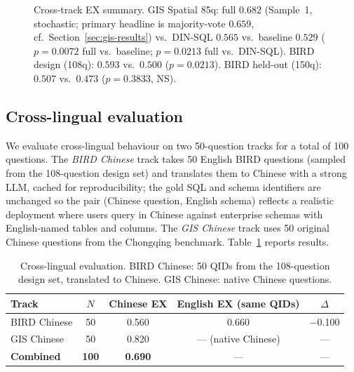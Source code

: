 \documentclass[11pt]{article}
\begin{document}
\begin{figure}[t]
\caption{Cross-track EX summary. GIS Spatial 85q: full $0.682$ (Sample~1, stochastic; primary headline is majority-vote $0.659$, cf.\ Section~\ref{sec:gis-results}) vs.\ DIN-SQL $0.565$ vs.\ baseline $0.529$ ($p=0.0072$ full vs.\ baseline; $p=0.0213$ full vs.\ DIN-SQL). BIRD design (108q): $0.593$ vs.\ $0.500$ ($p=0.0213$). BIRD held-out (150q): $0.507$ vs.\ $0.473$ ($p=0.3833$, NS).}
\label{fig:cross}
\end{figure}

\subsection{Cross-lingual evaluation}
\label{sec:cross-lingual}

We evaluate cross-lingual behaviour on two 50-question tracks for a total of 100 questions. The \emph{BIRD Chinese} track takes 50 English BIRD questions (sampled from the 108-question design set) and translates them to Chinese with a strong LLM, cached for reproducibility; the gold SQL and schema identifiers are unchanged so the pair (Chinese question, English schema) reflects a realistic deployment where users query in Chinese against enterprise schemas with English-named tables and columns. The \emph{GIS Chinese} track uses 50 original Chinese questions from the Chongqing benchmark. Table~\ref{tab:crosslingual} reports results.

\begin{table}[t]
\centering
\caption{Cross-lingual evaluation. BIRD Chinese: 50 QIDs from the 108-question design set, translated to Chinese. GIS Chinese: native Chinese questions.}
\label{tab:crosslingual}
\begin{tabular}{lcccc}
\toprule
Track & $N$ & Chinese EX & English EX (same QIDs) & $\Delta$ \\
\midrule
BIRD Chinese  & 50  & 0.560 & 0.660 & $-$0.100 \\
GIS Chinese   & 50  & 0.820 & --- (native Chinese)    & --- \\
\midrule
\textbf{Combined} & \textbf{100} & \textbf{0.690} & --- & --- \\
\bottomrule
\end{tabular}
\end{table}
\end{document}
